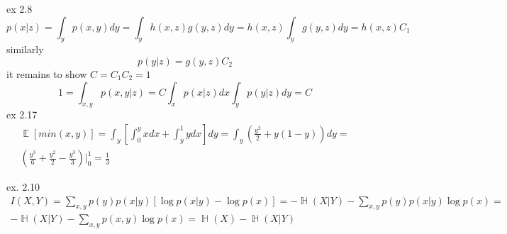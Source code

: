 \documentclass[12pt]{article}
\DeclareMathOperator{\E}{\mathbb{E}}
\DeclareMathOperator{\HH}{\mathbb{H}}
\begin{document}
ex 2.8
\begin{equation}
p(x|z) = \int_{y} p(x,y)dy = \int_{y}h(x,z)g(y,z)dy = h(x,z)\int_{y}g(y,z)dy = h(x,z)C_1
\end{equation}
similarly
\begin{equation}
p(y|z) = g(y,z)C_2
\end{equation}
it remains to show $C = C_1C_2 = 1$
\begin{equation}
1 = \int_{x,y}p(x,y|z) = C\int_{x}p(x|z)dx\int_{y}p(y|z)dy = C 
\end{equation}
ex 2.17
\begin{equation}
\begin{split}
\displaystyle 
\E[min(x,y)] = \int_{y}[\int_{0}^{y}xdx + \int_{y}^{1}ydx]dy = \int_{y}(\frac{y^2}{2} + y(1-y))dy =\\ 
(\frac{y^3}{6} + \frac{y^2}{2} - \frac{y^3}{3}) \biggr\rvert_{0}^{1} = \frac{1}{3}
\end{split}
\end{equation}

ex. 2.10
\begin{equation}
\begin{split}
\displaystyle 
I(X,Y) = \sum_{x,y}p(y)p(x|y)[\log p(x|y) - \log p(x)] = -\HH(X|Y) - \sum_{x,y}p(y)p(x|y)\log p(x) = \\ -\HH(X|Y) - \sum_{x,y}p(x,y)\log p(x) = \HH(X) - \HH(X|Y)
\end{split}
\end{equation}
\end{document}
